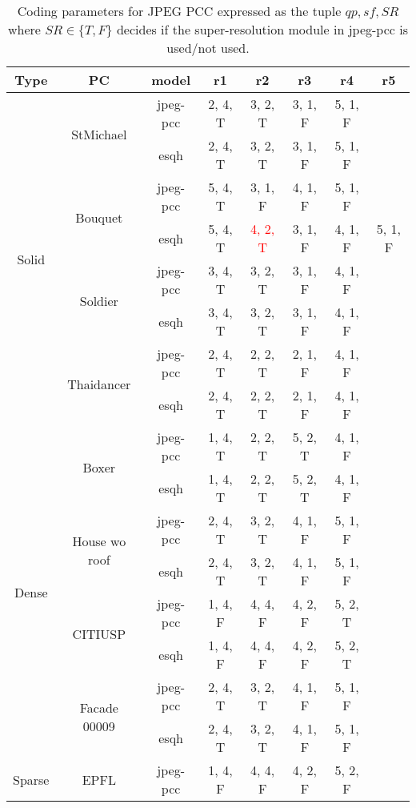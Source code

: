 

\begin{table*}
    \caption{Coding parameters for JPEG PCC expressed as the tuple $qp, sf, SR$ where $SR \in \{T, F\}$ decides if the super-resolution module in \gls{jpeg-pcc} is used/not used.}
    \centering
    \begin{tabular}{|c|c|c|c|c|c|c|c|}
    \hline
    Type & PC & model & r1 & r2 & r3 & r4 & r5 \\
    \hline
    \multirow{8}{*}{Solid} & \multirow{2}{*}{StMichael} & \gls{jpeg-pcc} & 2, 4, T & 3, 2, T & 3, 1, F& 5, 1, F & \\
    &  & \gls{esqh} & 2, 4, T & 3, 2, T & 3, 1, F & 5, 1, F & \\
    \cline{2-8}
    & \multirow{2}{*}{Bouquet} & \gls{jpeg-pcc} & 5, 4, T & 3, 1, F  & 4, 1, F& 5, 1, F & \\
    &  & \gls{esqh} & 5, 4, T & \textcolor{red}{4, 2, T} & 3, 1, F  & 4, 1, F & 5, 1, F\\
    \cline{2-8}
    & \multirow{2}{*}{Soldier} & \gls{jpeg-pcc} & 3, 4, T & 3, 2, T & 3, 1, F& 4, 1, F & \\
    &  & \gls{esqh} &  3, 4, T & 3, 2, T & 3, 1, F& 4, 1, F & \\
    \cline{2-8}
    & \multirow{2}{*}{Thaidancer} & \gls{jpeg-pcc} & 2, 4, T & 2, 2, T & 2, 1, F& 4, 1, F & \\
    &  & \gls{esqh} &  2, 4, T & 2, 2, T & 2, 1, F& 4, 1, F & \\
    \hline
    \multirow{8}{*}{Dense} & \multirow{2}{*}{Boxer} & \gls{jpeg-pcc} & 1, 4, T & 2, 2, T & 5, 2, T & 4, 1, F & \\
    &  & \gls{esqh} & 1, 4, T & 2, 2, T & 5, 2, T& 4, 1, F & \\
    \cline{2-8}
    & \multirow{2}{*}{House wo roof} & \gls{jpeg-pcc} & 2, 4, T & 3, 2, T  & 4, 1, F& 5, 1, F & \\
    &  & \gls{esqh} & 2, 4, T & 3, 2, T  & 4, 1, F& 5, 1, F & \\
    \cline{2-8}
    & \multirow{2}{*}{CITIUSP} & \gls{jpeg-pcc} & 1, 4, F & 4, 4, F & 4, 2, F& 5, 2, T & \\
    &  & \gls{esqh} & 1, 4, F & 4, 4, F & 4, 2, F& 5, 2, T & \\
    \cline{2-8}
    & \multirow{2}{*}{Facade 00009} & \gls{jpeg-pcc} & 2, 4, T & 3, 2, T & 4, 1, F& 5, 1, F & \\
    &  & \gls{esqh} &   2, 4, T & 3, 2, T & 4, 1, F& 5, 1, F & \\
    \hline
    \multirow{8}{*}{Sparse} & \multirow{2}{*}{EPFL} & \gls{jpeg-pcc} & 1, 4, F & 4, 4, F & 4, 2, F& 5, 2, F & \\

\end{tabular}
\end{table*}
